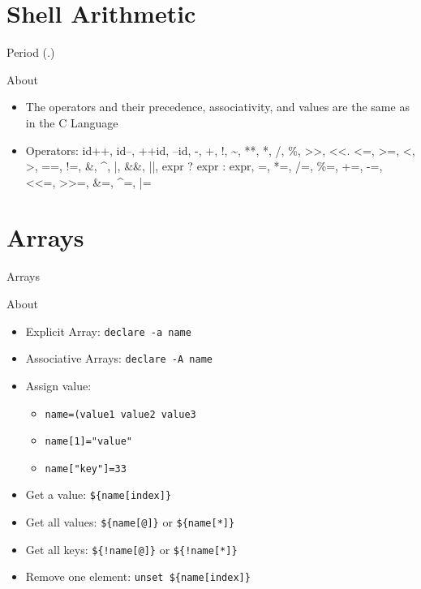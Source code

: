 \documentclass[10pt, compress, aspectratio=169]{beamer}
\begin{document}
\section{Shell Arithmetic}
\begin{frame}{Period (.)}
  \begin{exampleblock}{About}
    \begin{itemize}
      \item The operators and their precedence, associativity, and values are
						the same as in the C Language
			\item Operators: id++, id--, ++id, --id, -, +, !, \~{}, **, *, /, \%, >>,
						<<. <=, >=, <, >, ==, !=, \&, \^{}, |, \&\&, ||, expr ? expr : expr,
						=, *=, /=, \%=, +=, -=, <<=, >>=, \&=, \^{}=, |=
    \end{itemize}
  \end{exampleblock}
\end{frame}

\section{Arrays}
\begin{frame}{Arrays}
  \begin{exampleblock}{About}
    \begin{itemize}
      \item Explicit Array: \texttt{declare -a name}
			\item Associative Arrays: \texttt{declare -A name}
			\item Assign value:
			\begin{itemize}
				\item \texttt{name=(value1 value2 value3}
				\item \texttt{name[1]="value"}
				\item \texttt{name["key"]=33}
			\end{itemize}
			\item Get a value: \texttt{\$\{name[index]\}}
			\item Get all values: \texttt{\$\{name[@]\}} or \texttt{\$\{name[*]\}}
			\item Get all keys: \texttt{\$\{!name[@]\}} or \texttt{\$\{!name[*]\}}
			\item Remove one element: \texttt{unset \$\{name[index]\}}
    \end{itemize}
  \end{exampleblock}
\end{frame}
\end{document}
